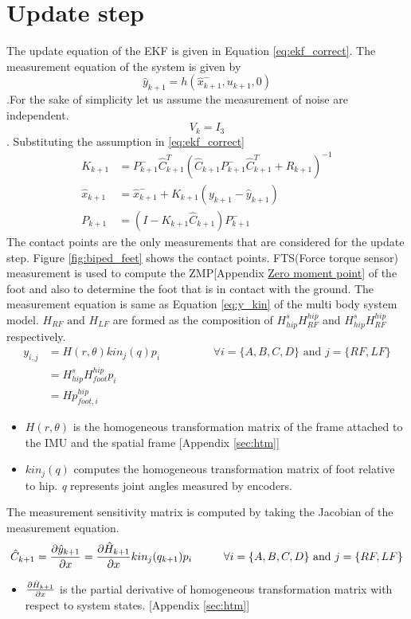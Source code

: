 \section{Update step}
The update equation of the EKF is given in Equation \ref{eq:ekf_correct}. The measurement equation of the system is given by $$\hat{y}_{k+1} = h(\hat{x}_{k+1}^-,u_{k+1},0)$$.For the sake of simplicity let us assume the measurement of noise are independent. $$V_k = I_3$$. Substituting the assumption in \ref{eq:ekf_correct}
\begin{equation}
\label{eq:imu_correct}
\begin{split}
K_{k+1} &= P_{k+1}^-\hat{C}_{k+1}^{T}(\hat{C}_{k+1}P_{k+1}^-\hat{C}_{k+1}^{T} + R_{k+1})^{-1}\\
\hat{x}_{k+1} &= \hat{x}_{k+1}^- + K_{k+1}(y_{k+1}-\hat{y}_{k+1})\\
P_{k+1} &= (I- K_{k+1}\hat{C}_{k+1})P_{k+1}^-
\end{split}
\end{equation}
The contact points are the only measurements that are considered for the update step. Figure \ref{fig:biped_feet} shows the contact points. FTS(Force torque sensor) measurement is used to compute the ZMP[Appendix \underline{Zero moment point}] of the foot and also to determine the foot that is in contact with the ground. The measurement equation is same as Equation \ref{eq:y_kin} of the multi body system model. $H_{RF} \text{ and } H_{LF} $ are formed as the composition of $H_{hip}^s H_{RF}^{hip}$ and $H_{hip}^s H_{RF}^{hip}$ respectively.
\begin{equation}
    \label{eq:imu_msr}
    \begin{split}
    y_{i,j} &= H(r,\theta) kin_j(q)p_i \hspace{2cm} \forall i=\{A,B,C,D\} \text{ and } j=\{RF,LF\} \\
    &= H_{hip}^s H_{foot}^{hip}p_i \\
    &= H p_{foot,i}^{hip}
    \end{split}
\end{equation}
\begin{itemize}
    \item $H(r,\theta)$ is the homogeneous transformation matrix of the frame attached to the IMU and the spatial frame [Appendix \ref{sec:htm}]
    \item $kin_j(q)$ computes the homogeneous transformation matrix of foot relative to hip. \emph{q} represents joint angles measured by encoders.
\end{itemize}
The measurement sensitivity matrix is computed by taking the Jacobian of the measurement equation.
\begin{equation}
        \hat{C}_{k+1} = \frac{\partial {\hat{y}_{k+1}}}{\partial {x}} = \frac{\partial {\hat{H}_{k+1}}}{\partial {x}} kin_j(q_{k+1}) p_i \hspace{1cm} \forall i=\{A,B,C,D\} \text{ and } j=\{RF,LF\} 
\end{equation}
\begin{itemize}
    \item $\frac{\partial {\hat{H}_{k+1}}}{\partial {x}}$ is the partial derivative of homogeneous transformation matrix with respect to system states. [Appendix \ref{sec:htm}]
\end{itemize}
